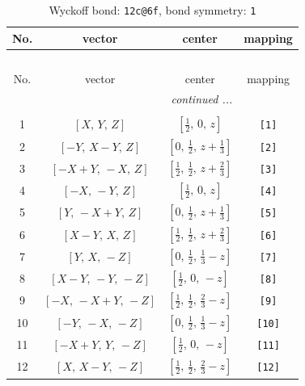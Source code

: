 \documentclass[fleqn,8pt]{jsarticle}
\begin{document}
\begin{longtable}{cccc}
\caption{Wyckoff bond: {\tt 12c@6f}, bond symmetry: {\tt 1}}
 \\
 \hline \hline
No. & vector & center & mapping \\ \hline \endfirsthead

\multicolumn{3}{l}{\tablename\ \thetable{}} \\
 \hline \hline
No. & vector & center & mapping \\ \hline \endhead

 \hline \hline
\multicolumn{3}{r}{\footnotesize\it continued ...} \\ \endfoot

 \hline \hline
\multicolumn{3}{r}{} \\ \endlastfoot

1 & $\left[ X,\, Y,\, Z \right]$ & $\left[ \frac{1}{2},\, 0,\, z \right]$ & {\tt [1]} \\ \hline
2 & $\left[ - Y,\, X - Y,\, Z \right]$ & $\left[ 0,\, \frac{1}{2},\, z + \frac{1}{3} \right]$ & {\tt [2]} \\ \hline
3 & $\left[ - X + Y,\, - X,\, Z \right]$ & $\left[ \frac{1}{2},\, \frac{1}{2},\, z + \frac{2}{3} \right]$ & {\tt [3]} \\ \hline
4 & $\left[ - X,\, - Y,\, Z \right]$ & $\left[ \frac{1}{2},\, 0,\, z \right]$ & {\tt [4]} \\ \hline
5 & $\left[ Y,\, - X + Y,\, Z \right]$ & $\left[ 0,\, \frac{1}{2},\, z + \frac{1}{3} \right]$ & {\tt [5]} \\ \hline
6 & $\left[ X - Y,\, X,\, Z \right]$ & $\left[ \frac{1}{2},\, \frac{1}{2},\, z + \frac{2}{3} \right]$ & {\tt [6]} \\ \hline
7 & $\left[ Y,\, X,\, - Z \right]$ & $\left[ 0,\, \frac{1}{2},\, \frac{1}{3} - z \right]$ & {\tt [7]} \\ \hline
8 & $\left[ X - Y,\, - Y,\, - Z \right]$ & $\left[ \frac{1}{2},\, 0,\, - z \right]$ & {\tt [8]} \\ \hline
9 & $\left[ - X,\, - X + Y,\, - Z \right]$ & $\left[ \frac{1}{2},\, \frac{1}{2},\, \frac{2}{3} - z \right]$ & {\tt [9]} \\ \hline
10 & $\left[ - Y,\, - X,\, - Z \right]$ & $\left[ 0,\, \frac{1}{2},\, \frac{1}{3} - z \right]$ & {\tt [10]} \\ \hline
11 & $\left[ - X + Y,\, Y,\, - Z \right]$ & $\left[ \frac{1}{2},\, 0,\, - z \right]$ & {\tt [11]} \\ \hline
12 & $\left[ X,\, X - Y,\, - Z \right]$ & $\left[ \frac{1}{2},\, \frac{1}{2},\, \frac{2}{3} - z \right]$ & {\tt [12]} \\
\end{longtable}
\end{document}

